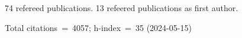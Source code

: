 74 refereed publications. 13 refeered publications as first author.

Total citations~=~4057; h-index~=~35 (2024-05-15)